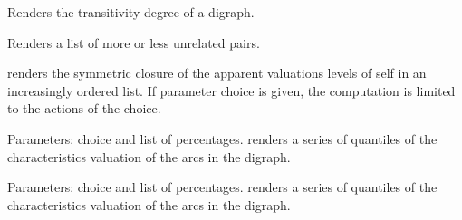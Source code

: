 \documentclass[letterpaper,10pt,english]{sphinxmanual}
\begin{document}
\begin{fulllineitems}
\begin{fulllineitems}
\end{fulllineitems}


\begin{fulllineitems}
\label{techDoc:digraphs.Digraph.computeTransitivityDegree}
Renders the transitivity degree of a digraph.

\end{fulllineitems}


\begin{fulllineitems}
\label{techDoc:digraphs.Digraph.computeUnrelatedPairs}
Renders a list of more or less unrelated pairs.

\end{fulllineitems}


\begin{fulllineitems}
\label{techDoc:digraphs.Digraph.computeValuationLevels}
renders the symmetric closure of the
apparent valuations levels of self
in an increasingly ordered list.
If parameter choice is given, the
computation is limited to the actions
of the choice.

\end{fulllineitems}


\begin{fulllineitems}
\label{techDoc:digraphs.Digraph.computeValuationPercentages}
Parameters: choice and list of percentages.
renders a series of quantiles of the characteristics valuation of
the arcs in the digraph.

\end{fulllineitems}


\begin{fulllineitems}
\label{techDoc:digraphs.Digraph.computeValuationPercentiles}
Parameters: choice and list of percentages.
renders a series of quantiles of the characteristics valuation of
the arcs in the digraph.


\end{fulllineitems}
\end{fulllineitems}
\end{document}
